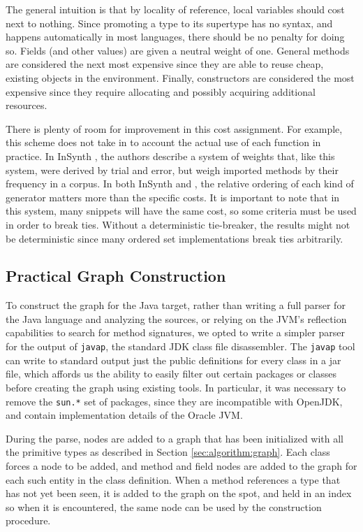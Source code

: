 The general intuition is that by locality of reference, local variables should cost next to nothing. Since promoting a type to its supertype has no syntax, and happens automatically in most languages, there should be no penalty for doing so. Fields (and other values) are given a neutral weight of one. General methods are considered the next most expensive since they are able to reuse cheap, existing objects in the environment. Finally, constructors are considered the most expensive since they require allocating and possibly acquiring additional resources.

There is plenty of room for improvement in this cost assignment. For example, this scheme does not take in to account the actual use of each function in practice. In InSynth \citep{GveroETAL13CompleteCompletionTypesWeights}, the authors describe a system of weights that, like this system, were derived by trial and error, but weigh imported methods by their frequency in a corpus. In both InSynth and \ourTool, the relative ordering of each kind of generator matters more than the specific costs. It is important to note that in this system, many snippets will have the same cost, so some criteria must be used in order to break ties. Without a deterministic tie-breaker, the results might not be deterministic since many ordered set implementations break ties arbitrarily.

\subsection{Practical Graph Construction}

To construct the graph for the Java target, rather than writing a full parser for the Java language and analyzing the sources, or relying on the JVM's reflection capabilities to search for method signatures, we opted to write a simpler parser for the output of \texttt{javap}, the standard JDK class file disassembler. The \texttt{javap} tool can write to standard output just the public definitions for every class in a jar file, which affords us the ability to easily filter out certain packages or classes before creating the graph using existing tools. In particular, it was necessary to remove the \texttt{sun.*} set of packages, since they are incompatible with OpenJDK, and contain implementation details of the Oracle JVM.

During the parse, nodes are added to a graph that has been initialized with all the primitive types as described in Section \ref{sec:algorithm:graph}. Each class forces a node to be added, and method and field nodes are added to the graph for each such entity in the class definition. When a method references a type that has not yet been seen, it is added to the graph on the spot, and held in an index so when it is encountered, the same node can be used by the construction procedure.

